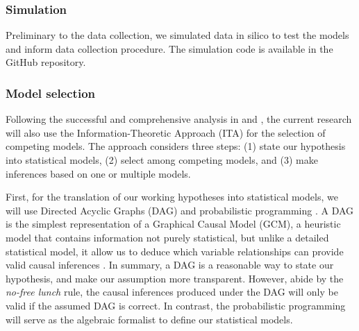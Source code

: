 \subsubsection{Simulation} \label{ssSA:model_simulation}
Preliminary to the data collection, we simulated data in silico to test the models and inform data collection procedure. The simulation code is available in the GitHub repository. \cite{Fogarty_et_al_2022}
\begin{comment}
Several functional correlation between age and knowledge have been simulated, and the model used in the analysis - which includes age as a ordinal categorical predictor of knowledge with monotonically increasing effect - has been able to recover the different shapes. Causal effect of activities, family composition and schooling have been simulated and tested.

The simulated data have been used -albeit in a previous version- to estimate the minimum number of interviewees necessary to recover the parameter values. If individuals were to name a maximum of 300 items in the freelist, 50 interviewees would have been suffcient to obtain reliable estimates of the parameters. Given that data collection in vivo is much less regular and less controllable than in silico, we roughly doubled the number of interviewees and that of questions.
\end{comment}
%
%
\subsubsection{Model selection} \label{ssSA:model_selection}
%
Following the successful and comprehensive analysis in \citet{vanDaal_2020} and \citet{Lesterhuis_2018}, the current research will also use the Information-Theoretic Approach (ITA) \citep{Anderson_2008, Chamberlain_1965} for the selection of competing models. The approach considers three steps: (1) state our hypothesis into statistical models, (2) select among competing models, and (3) make inferences based on one or multiple models.

First, for the translation of our working hypotheses into statistical models, we will use Directed Acyclic Graphs (DAG) and probabilistic programming \citep{Jaynes_2003}. A DAG is the simplest representation of a Graphical Causal Model (GCM), a heuristic model that contains information not purely statistical, but unlike a detailed statistical model, it allow us to deduce which variable relationships can provide valid causal inferences \citep{Hernan_et_al_2020, McElreath_2020}. In summary, a DAG is a reasonable way to state our hypothesis, and make our assumption more transparent. However, abide by the \textit{no-free lunch} rule, the causal inferences produced under the DAG will only be valid if the assumed DAG is correct. In contrast, the probabilistic programming will serve as the algebraic formalist to define our statistical models.

